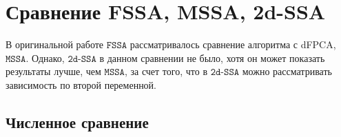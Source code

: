 \documentclass[12pt, specialist, subf
]{disser}
\theoremstyle{definition}
\newcommand{\SSA}{\texttt{SSA}}
\newcommand{\MSSA}{\texttt{MSSA}}
\newcommand{\FSSA}{\texttt{FSSA}}
\newcommand{\DSSA}{\texttt{2d-SSA}}
\newcommand{\TS}{\mathsf{X}}
\begin{document}















\section{Сравнение FSSA, MSSA, 2d-SSA}

\label{sec:compare_fssa_ssa}

В оригинальной работе $\FSSA$ \cite{haghbin2019functionalsingularspectrumanalysis} рассматривалось сравнение алгоритма с dFPCA, $\MSSA$. Однако, $\DSSA$ в данном сравнении не было, хотя он может показать результаты лучше, чем $\MSSA$, за счет того, что в $\DSSA$ можно рассматривать зависимость по второй переменной.


\subsection{Численное сравнение}
\end{document}

